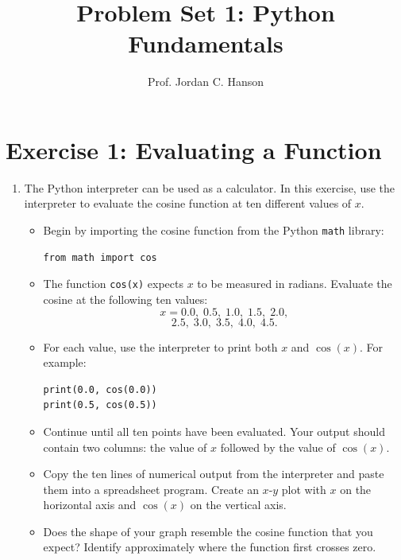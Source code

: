 \documentclass{article}
\begin{document}
\twocolumn

\title{Problem Set 1: Python Fundamentals}
\author{Prof. Jordan C. Hanson}

\maketitle

\section{Exercise 1: Evaluating a Function}

\begin{enumerate}

\item The Python interpreter can be used as a calculator.  In this exercise, use the interpreter to evaluate the cosine function at ten different values of $x$.

\begin{itemize}

\item Begin by importing the cosine function from the Python \texttt{math} library:
\begin{verbatim}
from math import cos
\end{verbatim}
\vspace{0.25cm}

\item The function \texttt{cos(x)} expects $x$ to be measured in radians.  Evaluate the cosine at the following ten values:
\[
x = 0.0,\; 0.5,\; 1.0,\; 1.5,\; 2.0,
\]
\[
2.5,\; 3.0,\; 3.5,\; 4.0,\; 4.5.
\]
\vspace{0.25cm}

\item For each value, use the interpreter to print both $x$ and $\cos(x)$.  For example:
\begin{verbatim}
print(0.0, cos(0.0))
print(0.5, cos(0.5))
\end{verbatim}
\vspace{0.25cm}

\item Continue until all ten points have been evaluated.  Your output should contain two columns: the value of $x$ followed by the value of $\cos(x)$. \\ \vspace{0.25cm}

\item Copy the ten lines of numerical output from the interpreter and paste them into a spreadsheet program.  Create an $x$-$y$ plot with $x$ on the horizontal axis and $\cos(x)$ on the vertical axis. \\ \vspace{0.5cm}

\item Does the shape of your graph resemble the cosine function that you expect?  Identify approximately where the function first crosses zero. \\ \vspace{0.5cm}

\end{itemize}
\end{enumerate}
\end{document}
